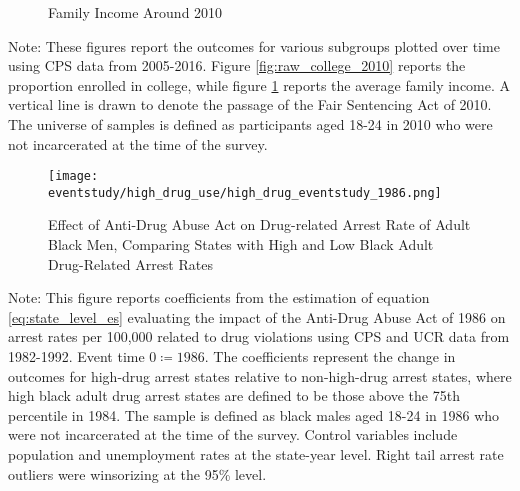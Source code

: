   \begin{figure}[h]
    \centering
    \caption{Family Income Around 2010}%
    \qquad
    \label{fig:raw_faminc_2010}%
  \end{figure}
  
  \begin{footnotesize}
    \noindent Note: These figures report the outcomes for various subgroups plotted over time using CPS data from 2005-2016. Figure \ref{fig:raw_college_2010} reports the proportion enrolled in college, while figure \ref{fig:raw_faminc_2010} reports the average family income. A vertical line is drawn to denote the passage of the Fair Sentencing Act of 2010. The universe of samples is defined as participants aged 18-24 in 2010 who were not incarcerated at the time of the survey.
  \end{footnotesize}
  
  \clearpage
  
  \begin{figure}[h]
    \caption{Effect of Anti-Drug Abuse Act on Drug-related Arrest Rate of Adult Black Men, Comparing States with High and Low Black Adult Drug-Related Arrest Rates}
    \centering
    \texttt{[image: eventstudy/high\_drug\_use/high\_drug\_eventstudy\_1986.png]}
    \label{fig:ab_es_1986}
  \end{figure}
  
  \begin{footnotesize}
    \noindent Note: This figure reports coefficients from the estimation of equation \ref{eq:state_level_es} evaluating the impact of the Anti-Drug Abuse Act of 1986 on arrest rates per 100,000 related to drug violations using CPS and UCR data from 1982-1992. Event time $0 \coloneqq 1986$. The coefficients represent the change in outcomes for high-drug arrest states relative to non-high-drug arrest states, where high black adult drug arrest states are defined to be those above the 75th percentile in 1984. The sample is defined as black males aged 18-24 in 1986 who were not incarcerated at the time of the survey. Control variables include population and unemployment rates at the state-year level. Right tail arrest rate outliers were winsorizing at the 95\% level.
  \end{footnotesize}
  
  \clearpage
  
